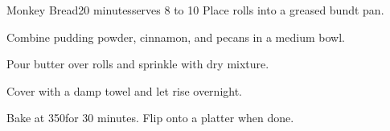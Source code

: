 \begin{recipe}{Monkey Bread}{20 minutes}{serves 8 to 10}
Place rolls into a greased bundt pan.

Combine pudding powder, cinnamon, and pecans in a medium bowl.

Pour butter over rolls and sprinkle with dry mixture.\newstep

Cover with a damp towel and let rise overnight.\newstep

Bake at 350\degrees for 30 minutes. Flip onto a platter when done.

\end{recipe}
